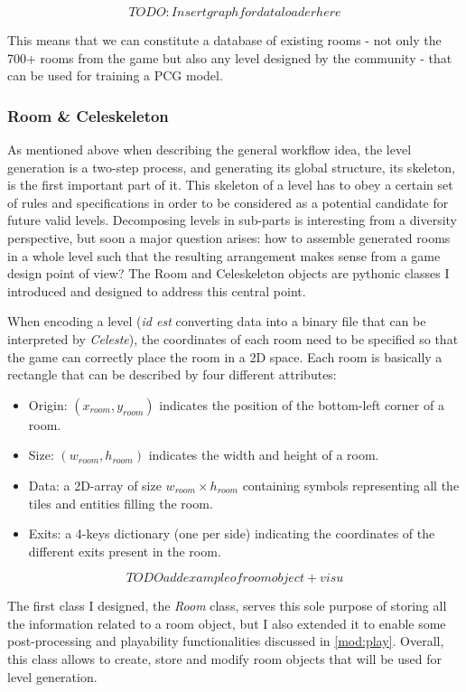 \documentclass{article}
\newcommand{\Celnosp}{\textit{Celeste}}
\begin{document}
$$TODO: Insert graph for data loader here$$

\noindent This means that we can constitute a database of existing rooms - not only the 700+ rooms from the game but also any level designed by the community - that can be used for training a PCG model. 

\subsubsection{Room \& Celeskeleton} \label{mod:skel}
As mentioned above when describing the general workflow idea, the level generation is a two-step process, and generating its global structure, its skeleton, is the first important part of it. This skeleton of a level has to obey a certain set of rules and specifications in order to be considered as a potential candidate for future valid levels. Decomposing levels in sub-parts is interesting from a diversity perspective, but soon a major question arises: how to assemble generated rooms in a whole level such that the resulting arrangement makes sense from a game design point of view?
The Room and Celeskeleton objects are pythonic classes I introduced and designed to address this central point.

\noindent When encoding a level (\textit{id est} converting data into a binary file that can be interpreted by \Celnosp), the coordinates of each room need to be specified so that the game can correctly place the room in a 2D space. Each room is basically a rectangle that can be described by four different attributes:
\begin{itemize}
    \item Origin: $(x_{room}, y_{room})$ indicates the position of the bottom-left corner of a room.
    \item Size: $(w_{room}, h_{room})$ indicates the width and height of a room.
    \item Data: a 2D-array of size $w_{room} \times h_{room}$ containing symbols representing all the tiles and entities filling the room.
    \item Exits: a 4-keys dictionary (one per side) indicating the coordinates of the different exits present in the room.
\end{itemize}

$$TODO add example of room object + visu$$

The first class I designed, the \textit{Room} class, serves this sole purpose of storing all the information related to a room object, but I also extended it to enable some post-processing and playability functionalities discussed in \ref{mod:play}. Overall, this class allows to create, store and modify room objects that will be used for level generation.
\end{document}
